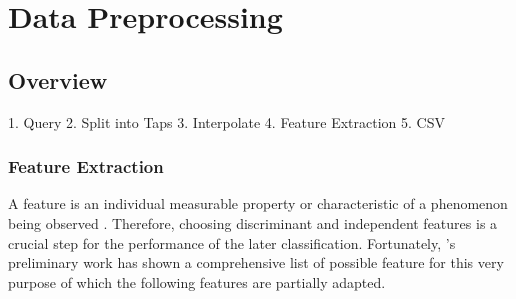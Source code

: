 \chapter{Data Preprocessing \label{cha:chapter4}}
\section{Overview}
1. Query 2. Split into Taps 3. Interpolate 4. Feature Extraction 5. CSV
\subsection{Feature Extraction}
A feature is an individual measurable property or characteristic of a phenomenon being observed \cite{Duda:2000:PC:954544}. Therefore, choosing discriminant and independent features is a crucial step for the performance of the later classification. Fortunately, \citeauthor{Tapprints}'s preliminary work has shown a comprehensive list of possible feature for this very purpose of which the following features are partially adapted.\\


